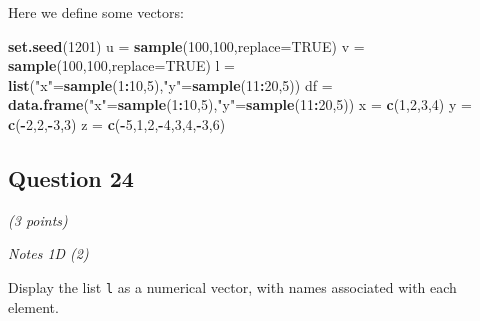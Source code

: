 \documentclass[
]{article}
\newenvironment{Shaded}{\begin{snugshade}}{\end{snugshade}}
\newcommand{\DataTypeTok}[1]{\textcolor[rgb]{0.13,0.29,0.53}{#1}}
\newcommand{\DecValTok}[1]{\textcolor[rgb]{0.00,0.00,0.81}{#1}}
\newcommand{\KeywordTok}[1]{\textcolor[rgb]{0.13,0.29,0.53}{\textbf{#1}}}
\newcommand{\NormalTok}[1]{#1}
\newcommand{\OperatorTok}[1]{\textcolor[rgb]{0.81,0.36,0.00}{\textbf{#1}}}
\newcommand{\OtherTok}[1]{\textcolor[rgb]{0.56,0.35,0.01}{#1}}
\newcommand{\StringTok}[1]{\textcolor[rgb]{0.31,0.60,0.02}{#1}}
\begin{document}
Here we define some vectors:

\begin{Shaded}
\begin{Highlighting}[]
\KeywordTok{set.seed}\NormalTok{(}\DecValTok{1201}\NormalTok{)}
\NormalTok{u =}\StringTok{ }\KeywordTok{sample}\NormalTok{(}\DecValTok{100}\NormalTok{,}\DecValTok{100}\NormalTok{,}\DataTypeTok{replace=}\OtherTok{TRUE}\NormalTok{)}
\NormalTok{v =}\StringTok{ }\KeywordTok{sample}\NormalTok{(}\DecValTok{100}\NormalTok{,}\DecValTok{100}\NormalTok{,}\DataTypeTok{replace=}\OtherTok{TRUE}\NormalTok{)}
\NormalTok{l =}\StringTok{ }\KeywordTok{list}\NormalTok{(}\StringTok{"x"}\NormalTok{=}\KeywordTok{sample}\NormalTok{(}\DecValTok{1}\OperatorTok{:}\DecValTok{10}\NormalTok{,}\DecValTok{5}\NormalTok{),}\StringTok{"y"}\NormalTok{=}\KeywordTok{sample}\NormalTok{(}\DecValTok{11}\OperatorTok{:}\DecValTok{20}\NormalTok{,}\DecValTok{5}\NormalTok{))}
\NormalTok{df =}\StringTok{ }\KeywordTok{data.frame}\NormalTok{(}\StringTok{"x"}\NormalTok{=}\KeywordTok{sample}\NormalTok{(}\DecValTok{1}\OperatorTok{:}\DecValTok{10}\NormalTok{,}\DecValTok{5}\NormalTok{),}\StringTok{"y"}\NormalTok{=}\KeywordTok{sample}\NormalTok{(}\DecValTok{11}\OperatorTok{:}\DecValTok{20}\NormalTok{,}\DecValTok{5}\NormalTok{))}
\NormalTok{x =}\StringTok{ }\KeywordTok{c}\NormalTok{(}\DecValTok{1}\NormalTok{,}\DecValTok{2}\NormalTok{,}\DecValTok{3}\NormalTok{,}\DecValTok{4}\NormalTok{)}
\NormalTok{y =}\StringTok{ }\KeywordTok{c}\NormalTok{(}\OperatorTok{-}\DecValTok{2}\NormalTok{,}\DecValTok{2}\NormalTok{,}\OperatorTok{-}\DecValTok{3}\NormalTok{,}\DecValTok{3}\NormalTok{)}
\NormalTok{z =}\StringTok{ }\KeywordTok{c}\NormalTok{(}\OperatorTok{-}\DecValTok{5}\NormalTok{,}\DecValTok{1}\NormalTok{,}\DecValTok{2}\NormalTok{,}\OperatorTok{-}\DecValTok{4}\NormalTok{,}\DecValTok{3}\NormalTok{,}\DecValTok{4}\NormalTok{,}\OperatorTok{-}\DecValTok{3}\NormalTok{,}\DecValTok{6}\NormalTok{)}
\end{Highlighting}
\end{Shaded}

\hypertarget{question-24}{%
\subsection{Question 24}\label{question-24}}

\emph{(3 points)}

\emph{Notes 1D (2)}

Display the list \texttt{l} as a numerical vector, with names associated
with each element.
\end{document}
